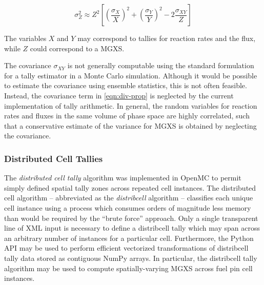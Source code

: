 \begin{equation}
\label{eqn:div-prop}
\sigma_{Z}^{2} \approx Z^{2}\left[\left(\frac{\sigma_{X}}{X}\right)^{2} + \left(\frac{\sigma_{Y}}{Y}\right)^{2} - 2\frac{\sigma_{XY}}{Z}\right]
\end{equation}

\noindent The variables $X$ and $Y$ may correspond to tallies for reaction rates and the flux, while $Z$ could correspond to a MGXS.

The covariance $\sigma_{XY}$ is not generally computable using the standard formulation for a tally estimator in a Monte Carlo simulation. Although it would be possible to estimate the covariance using ensemble statistics, this is not often feasible. Instead, the covariance term in \autoref{eqn:div-prop} is neglected by the current implementation of tally arithmetic. In general, the random variables for reaction rates and fluxes in the same volume of phase space are highly correlated, such that a conservative estimate of the variance for MGXS is obtained by neglecting the covariance.

\subsubsection{Distributed Cell Tallies}
\label{subsec:distribcells}


The \textit{distributed cell tally} algorithm was implemented in OpenMC \cite{lax2014distribcell} to permit simply defined spatial tally zones across repeated cell instances. The distributed cell algorithm -- abbreviated as the \textit{distribcell} algorithm -- classifies each unique cell instance using a process which consumes orders of magnitude less memory than would be required by the ``brute force'' approach. Only a single transparent line of XML input is necessary to define a distribcell tally which may span across an arbitrary number of instances for a particular cell. Furthermore, the Python API may be used to perform efficient vectorized transformations of distribcell tally data stored as contiguous NumPy arrays. In particular, the distribcell tally algorithm may be used to compute spatially-varying MGXS across fuel pin cell instances.

